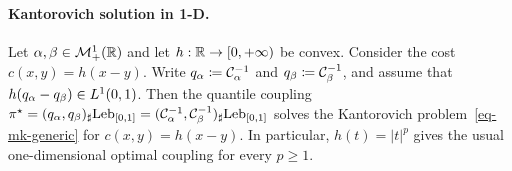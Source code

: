 \paragraph{Kantorovich solution in 1-D.}\label{sec-1d-kantorovich-solution}
\begin{thm}\label{prop-1d-kantorovich-quantile-coupling}
Let $\alpha,\beta\in\mathcal{M}_+^1(\mathbb{R})$ and let $h:\mathbb{R}\to[0,+\infty)$ be convex. Consider the cost $c(x,y)=h(x-y)$. Write $q_\alpha\coloneqq\mathcal{C}_{\alpha}^{-1}$ and $q_\beta\coloneqq\mathcal{C}_{\beta}^{-1}$, and assume that $h(q_\alpha-q_\beta)\in L^1(0,1)$. Then the quantile coupling
\(\pi^\star=(q_\alpha,q_\beta)_\sharp\mathrm{Leb}_{[0,1]} = (\mathcal{C}_{\alpha}^{-1},\mathcal{C}_{\beta}^{-1})_\sharp\mathrm{Leb}_{[0,1]}\)
solves the Kantorovich problem~\eqref{eq-mk-generic} for $c(x,y)=h(x-y)$.
In particular, $h(t)=|t|^p$ gives the usual one-dimensional optimal coupling for every $p\geq1$.
\end{thm}
